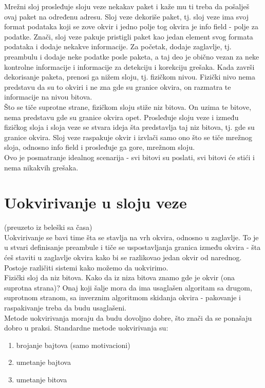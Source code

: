 \documentclass{article} %
\begin{document}
Mrežni sloj prosleđuje sloju veze nekakav paket i kaže mu ti treba da pošalješ ovaj paket na određenu adresu. Sloj veze dekoriše paket, tj. sloj veze ima svoj format podataka koji se zove okvir i jedno polje tog okvira je info field - polje za podatke. Znači, sloj veze pakuje pristigli paket kao jedan element svog formata podataka i dodaje nekakve informacije. Za početak, dodaje zaglavlje, tj. preambulu i dodaje neke podatke posle paketa, a taj deo je obično vezan za neke kontrolne informacije i informacije za detekciju i korekciju grešaka. Kada završi dekorisanje paketa, prenosi ga nižem sloju, tj. fizičkom nivou. Fizički nivo nema predstavu da su to okviri i ne zna gde su granice okvira, on razmatra te informacije na nivou bitova. \\

Što se tiče suprotne strane, fizičkom sloju stiže niz bitova. On uzima te bitove, nema predstavu gde su granice okvira opet. Prosleđuje sloju veze i između fizičkog sloja i sloja veze se stvara ideja šta predstavlja taj niz bitova, tj. gde su granice okvira. Sloj veze raspakuje okvir i izvlači samo ono što se tiče mrežnog sloja, odnosno info field i prosleđuje ga gore, mrežnom sloju.
\\

Ovo je posmatranje idealnog scenarija - svi bitovi su poslati, svi bitovi će stići i nema nikakvih grešaka.
\section{Uokvirivanje u sloju veze}
(preuzeto iz beleški sa časa)\\

Uokvirivanje se bavi time šta se stavlja na vrh okvira, odnosno u zaglavlje. To je u stvari definisanje preambule i  tiče se uspostavljanja granica između okvira - šta ćeš staviti u zaglavlje okvira kako bi se razlikovao jedan okvir od narednog. Postoje različiti sistemi kako možemo da uokvirimo.\\

Fizički sloj da niz bitova. Kako da iz niza bitova znamo gde je okvir (ona suprotna strana)? Onaj koji šalje mora da ima usaglašen algoritam sa drugom, suprotnom stranom, sa inverznim algoritmom skidanja okvira - pakovanje i raspakivanje treba da budu usaglašeni. \\

Metode uokvirivanja moraju da budu dovoljno dobre, što znači da se ponašaju dobro u praksi. Standardne metode uokvirivanja su:
\begin{enumerate}
  \item brojanje bajtova (samo motivacioni)
  \item umetanje bajtova
  \item umetanje bitova
\end{enumerate}
\end{document}
